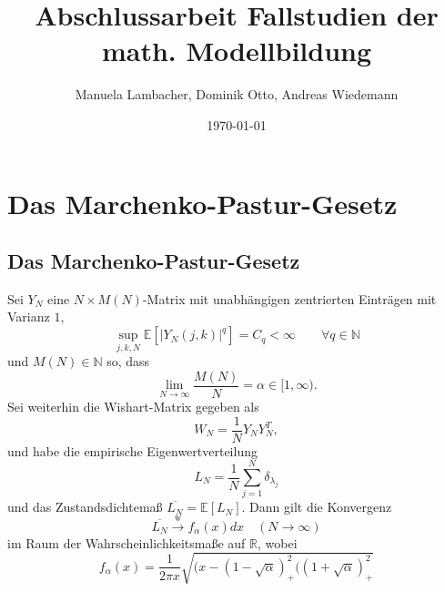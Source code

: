\documentclass[a4paper, 11pt]{scrreprt}
\title{Abschlussarbeit Fallstudien der math. Modellbildung}
\author{Manuela Lambacher, Dominik Otto, Andreas Wiedemann}
\date{\today}
\newcommand{\RR}{\mathbb{R}}
\newcommand{\EE}{\mathbb{E}}
\newcommand{\NN}{\mathbb{N}}
\begin{document}
\parindent 0pt
\maketitle


\chapter{Das Marchenko-Pastur-Gesetz}

\section*{Das Marchenko-Pastur-Gesetz}

Sei \(Y_N\) eine \(N\times M(N)\)-Matrix mit unabhängigen zentrierten Einträgen mit Varianz \(1\),
	\[\sup_{j,k,N} \EE\left[ | Y_N(j,k)|^q\right] = C_q < \infty \qquad \forall q \in \NN\]
und \(M(N) \in \NN\) so, dass
	\[\lim_{N\to\infty} \frac{M(N)}{N} = \alpha \in[1,\infty). \]
Sei weiterhin die Wishart-Matrix gegeben als 
	\[W_N = \frac{1}{N}Y_NY_N^T,\]
und habe die empirische Eigenwertverteilung
	\[L_N = \frac{1}{N} \sum_{j=1}^{N} \delta_{\lambda_j} \]
und das Zustandsdichtemaß \(\overline{L_N} = \EE[L_N]\). Dann gilt die Konvergenz
	\[\overline{L_N} \xrightarrow{\text{w}} f_{\alpha}(x)dx \quad(N\to\infty)\]
im Raum der Wahrscheinlichkeitsmaße auf \(\RR\), wobei
	\[f_{\alpha}(x)=\frac{1}{2\pi x}\sqrt{(x-(1-\sqrt{\alpha})^2_{+}((1+\sqrt{\alpha})^2_{+}} \]

\newpage
\end{document}
